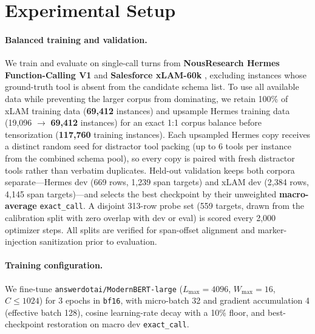 \section{Experimental Setup}
\label{sec:setup}

\paragraph{Balanced training and validation.}
We train and evaluate on single-call turns from \textbf{NousResearch Hermes Function-Calling V1} \citep{teknium2024hermes} and \textbf{Salesforce xLAM-60k} \citep{zhang2024xlam}, excluding instances whose ground-truth tool is absent from the candidate schema list. To use all available data while preventing the larger corpus from dominating, we retain 100\% of xLAM training data (\textbf{69,412} instances) and upsample Hermes training data (19,096 $\rightarrow$ \textbf{69,412} instances) for an exact 1:1 corpus balance before tensorization (\textbf{117,760} training instances). Each upsampled Hermes copy receives a distinct random seed for distractor tool packing (up to 6 tools per instance from the combined schema pool), so every copy is paired with fresh distractor tools rather than verbatim duplicates. Held-out validation keeps both corpora separate---Hermes dev (669 rows, 1,239 span targets) and xLAM dev (2,384 rows, 4,145 span targets)---and selects the best checkpoint by their unweighted \textbf{macro-average} \texttt{exact\_call}. A disjoint 313-row probe set (559 targets, drawn from the calibration split with zero overlap with dev or eval) is scored every 2,000 optimizer steps. All splits are verified for span-offset alignment and marker-injection sanitization prior to evaluation.

\paragraph{Training configuration.}
We fine-tune \texttt{answerdotai/ModernBERT-large} ($L_{\max}{=}4096$, $W_{\max}{=}16$, $C{\le}1024$) for 3 epochs in \texttt{bf16}, with micro-batch 32 and gradient accumulation 4 (effective batch 128), cosine learning-rate decay with a 10\% floor, and best-checkpoint restoration on macro dev \texttt{exact\_call}.


